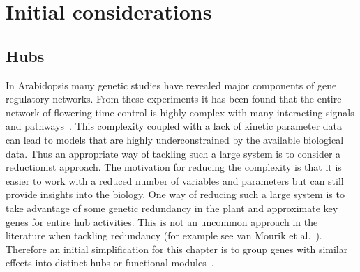 \section{Initial considerations}
\subsection{Hubs}

In Arabidopsis many genetic studies have revealed major components of gene regulatory networks.
From these experiments it has been found that the entire network of flowering time control is highly complex with many interacting signals and pathways~\cite{turck2008,higgins2010}.
This complexity coupled with a lack of kinetic parameter data can lead to models that are highly underconstrained by the available biological data.
Thus an appropriate way of tackling such a large system is to consider a reductionist approach.
The motivation for reducing the complexity is that it is easier to work with a reduced number of variables and parameters but can still provide insights into the biology.
One way of reducing such a large system is to take advantage of some genetic redundancy in the plant and approximate key genes for entire hub activities.
This is not an uncommon approach in the literature when tackling redundancy (for example see van Mourik et al.~\cite{vanmourik2010}).
Therefore an initial simplification for this chapter is to group genes with similar effects into distinct hubs or functional modules~\cite{alon2006}.


